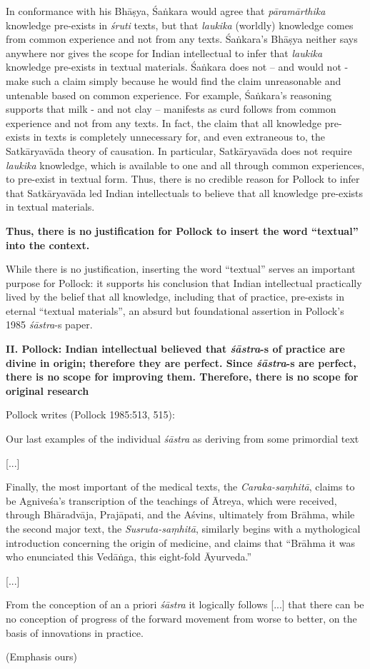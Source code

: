 In conformance with his Bhāṣya, Śaṅkara would agree that {\sl pāramārthika} knowledge pre-exists in {\sl śruti} texts, but that {\sl laukika} (worldly) knowledge comes from common experience and not from any texts. Śaṅ\-kara's Bhāṣya neither says anywhere nor gives the scope for Indian intellectual to infer that {\sl laukika} knowledge pre-exists in textual materials.  Śaṅkara does not -- and would not - make such a claim simply because he would find the claim unreasonable and untenable based on common experience. For example, Śaṅkara's reasoning supports that milk - and not clay -- manifests as curd follows from common experience and not from any texts. In fact, the claim that all knowledge pre-exists in texts is completely unnecessary for, and even extraneous to, the Satkāryavāda theory of causation. In particular, Satkāryavāda does not require {\sl laukika} knowledge, which is available to one and all through common experiences, to pre-exist in textual form. Thus, there is no credible reason for Pollock to infer that Satkāryavāda led Indian intellectuals to believe that all knowledge pre-exists in textual materials.

\textbf{Thus, there is no justification for Pollock to insert the word ``textual'' into the context.}

While there is no justification, inserting the word ``textual'' serves an important purpose for Pollock: it supports his conclusion that Indian intellectual practically lived by the belief that all knowledge, including that of practice, pre-exists in eternal ``textual materials'', an absurd but foundational assertion in Pollock's 1985 {\sl śāstra}-s paper.

\newpage

{\bf II. Pollock: Indian intellectual believed that {{\sl\bfseries śāstra}\relax}-s of practice are divine in origin; therefore they are perfect. Since {{\sl\bfseries śāstra}\relax}-s are perfect, there is no scope for improving them. Therefore, there is no scope for original research}

Pollock writes (Pollock 1985:513, 515):
\begin{myquote}
Our last examples of the individual {\sl śāstra} as deriving from some primordial text 

[...]

Finally, the most important of the medical texts, the {\sl Caraka-saṃhitā}, claims to be Agniveśa's transcription of the teachings of Ātreya, which were received, through Bhāradvāja, Prajāpati, and the Aśvins, ultimately from Brāhma, while the second major text, the {\sl Susruta-saṃhitā}, similarly begins with a mythological introduction concerning the origin of medicine, and claims that ``Brāhma it was who enunciated this Vedāṅga, this eight-fold Āyurveda.''

[...]

From the conception of an a priori {\sl śāstra} it logically follows [...] that there can be no conception of progress of the forward movement from worse to better, on the basis of innovations in practice. 

\hfill (Emphasis ours)
\end{myquote}

